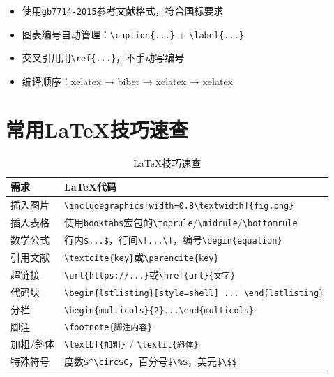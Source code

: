 \begin{notebox}[毕业论文排版建议]
\begin{itemize}[leftmargin=1em]
  \item 使用\texttt{gb7714-2015}参考文献格式，符合国标要求
  \item 图表编号自动管理：\texttt{\textbackslash caption\{...\}} + \texttt{\textbackslash label\{...\}}
  \item 交叉引用用\texttt{\textbackslash ref\{...\}}，不手动写编号
  \item 编译顺序：xelatex → biber → xelatex → xelatex
\end{itemize}
\end{notebox}

\section{常用LaTeX技巧速查}

\begin{table}[H]
\centering
\small
\begin{tabular}{lp{7cm}}
\toprule
\textbf{需求} & \textbf{LaTeX代码} \\
\midrule
插入图片 & \texttt{\textbackslash includegraphics[width=0.8\textbackslash textwidth]\{fig.png\}} \\
插入表格 & 使用\texttt{booktabs}宏包的\texttt{\textbackslash toprule}/\texttt{\textbackslash midrule}/\texttt{\textbackslash bottomrule} \\
数学公式 & 行内\texttt{\$...\$}，行间\texttt{\textbackslash [...\textbackslash ]}，编号\texttt{\textbackslash begin\{equation\}} \\
引用文献 & \texttt{\textbackslash textcite\{key\}}或\texttt{\textbackslash parencite\{key\}} \\
超链接 & \texttt{\textbackslash url\{https://...\}}或\texttt{\textbackslash href\{url\}\{文字\}} \\
代码块 & \texttt{\textbackslash begin\{lstlisting\}[style=shell] ... \textbackslash end\{lstlisting\}} \\
分栏 & \texttt{\textbackslash begin\{multicols\}\{2\}...\textbackslash end\{multicols\}} \\
脚注 & \texttt{\textbackslash footnote\{脚注内容\}} \\
加粗/斜体 & \texttt{\textbackslash textbf\{加粗\}} / \texttt{\textbackslash textit\{斜体\}} \\
特殊符号 & 度数\texttt{\$\^{}\textbackslash circ\$C}，百分号\texttt{\$\textbackslash \%\$}，美元\texttt{\$\textbackslash\$\$} \\
\bottomrule
\end{tabular}
\caption{LaTeX技巧速查}
\end{table}

